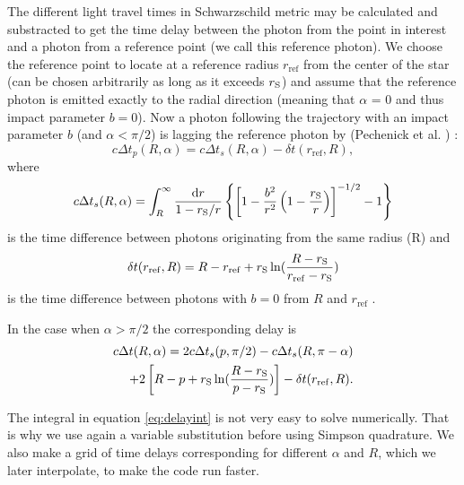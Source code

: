 \documentclass{wihuri}
\def\rg{r_{\rm S}} %
\def\be{\begin{equation}}
\def\ee{\end{equation}}
\def\d{{\rm d}}
\def\rg{r_{\rm S}} %
\begin{document}
The different light travel times in Schwarzschild metric may be calculated and substracted to get the time delay between the photon from the point in interest and a photon from a reference point (we call this reference photon). We choose the reference point to locate at a reference radius $r_{\mathrm{ref}}$ from the center of the star (can be chosen arbitrarily as long as it exceeds $\rg$) and assume that the reference photon is emitted exactly to the radial direction (meaning that $\alpha$ = 0 and thus impact parameter $b = 0$). Now a photon following the trajectory with an impact parameter $b$ (and $\alpha < \pi/2$) is lagging the reference photon by 
(Pechenick et al. \cite{pechenick})%
:
\be \label{eq:delay2}
c\Delta t_{p}(R,\alpha)=  c\Delta t_{s}(R,\alpha) -\delta t(r_{\mathrm{ref}},R),
\ee
where 
\be \label{eq:delayint}
c\Delta t_{s}(R,\alpha) =
\int_R^{\infty} \frac{\d r}{1- \rg/r}
\left\{ \left[ 1-  \frac{b^2}{r^2}  \left( 1- \frac{\rg}{r} \right)
\right] ^{-1/2}  -1 \right\}
\ee
is the time difference between photons originating from the same radius (R) and
\be
\delta t(r_{\mathrm{ref}},R) = R-r_{\mathrm{ref}}+\rg\ln(\frac{R-\rg}{r_{\mathrm{ref}}-\rg})
\ee
is the time difference between photons with $b=0$ from $R$ and $r_{\mathrm{ref}}$ \cite{falkner}. 

In the case when $\alpha > \pi/2$ the corresponding delay is
\be\label{eq:delay22}
\begin{split}
c\Delta t(R,\alpha)= 2c\Delta t_{s}(p,\pi/2)-c\Delta t_{s}(R,\pi-\alpha)\\+2\left[ R-p+\rg\ln(\frac{R-\rg}{p-\rg})\right]-\delta t(r_{\mathrm{ref}},R).
\end{split}
\ee

The integral in equation \ref{eq:delayint} is not very easy to solve numerically. That is why we use again a variable substitution before using Simpson quadrature. We also make a grid of time delays corresponding for different $\alpha$ and $R$, which we later interpolate, to make the code run faster.
\end{document}
